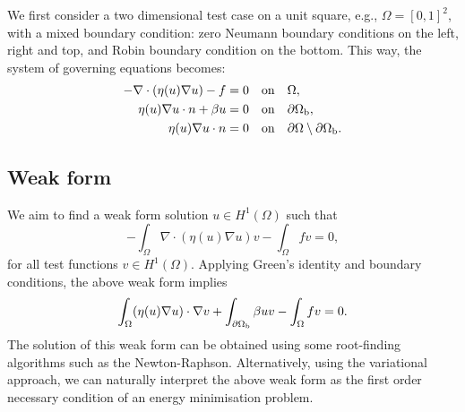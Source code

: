 \documentclass[a4paper,11pt]{scrartcl}
\newcommand{\eq}[1]{\begin{equation} #1 \end{equation}}
\newcommand{\eqs}[1]{\begin{align} #1 \end{align}}
\begin{document}
We first consider a two dimensional test case on a unit square, e.g., $\Omega = [0, 1]^2$, with a mixed boundary condition: zero Neumann boundary conditions on the left, right and top, and Robin boundary condition on the bottom. This way, the system of governing equations becomes:
\eqs{
- \nabla \cdot ( \eta(u ) \nabla u ) - f = 0 \quad & {\rm on} \quad \Omega , \\
\eta(u) \nabla u \cdot n + \beta u = 0 \quad & {\rm on} \quad \partial \Omega_{\rm b} , \\
\eta(u) \nabla u \cdot n = 0 \quad & {\rm on} \quad \partial \Omega \setminus \partial \Omega_{\rm b}.
}

\subsection{Weak form}
%


We aim to find a weak form solution $u \in H^1(\Omega)$ such that
\eq{ - \int_{\Omega}  \nabla \cdot ( \eta(u ) \nabla u) v - \int_{\Omega} f v  = 0 ,}
for all test functions $v \in H^1(\Omega)$.
%
Applying Green's identity and boundary conditions, the above weak form implies
\eq{ \int_{\Omega} (\eta(u) \nabla u) \cdot \nabla v+ \int_{\partial\Omega_{\rm b}} \beta uv  - \int_{\Omega} fv = 0 . \label{eq:pp_weak}}
%
The solution of this weak form can be obtained using some root-finding algorithms such as the Newton-Raphson. Alternatively, using the variational approach, we can naturally interpret the above weak form as the first order necessary condition of an energy minimisation problem.
\end{document}
